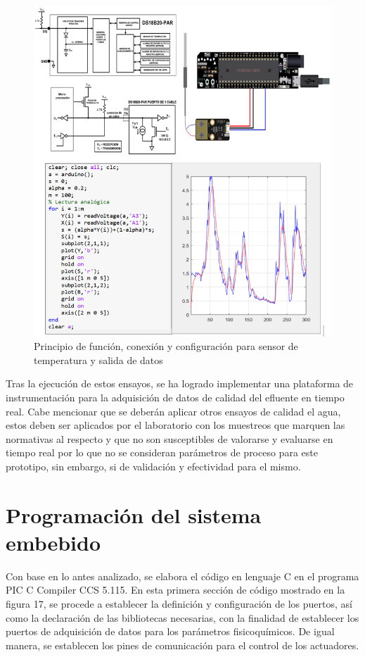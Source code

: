 \documentclass[conference]{IEEEtran}
\begin{document}
\begin{figure}[htbp]
	\centering
	\includegraphics[width=0.9\columnwidth]{fig16.png}
	\caption{Principio de función, conexión y configuración para sensor de temperatura y salida de datos}
	\label{fig:sensor-ph-temperatura}
\end{figure}

Tras la ejecución de estos ensayos, se ha logrado implementar una plataforma de instrumentación para la adquisición de datos de calidad del efluente en tiempo real. Cabe mencionar que se deberán aplicar otros ensayos de calidad el agua, estos deben ser aplicados por el laboratorio con los muestreos que marquen las normativas al respecto y que no son susceptibles de valorarse y evaluarse en tiempo real por lo que no se consideran parámetros de proceso para este prototipo, sin embargo, si de validación y efectividad para el mismo.

\section{Programación del sistema embebido}

Con base en lo antes analizado, se elabora el código en lenguaje C en el programa PIC C Compiler CCS 5.115. En esta primera sección de código mostrado en la figura 17, se procede a establecer la definición y configuración de los puertos, así como la declaración de las bibliotecas necesarias, con la finalidad de establecer los puertos de adquisición de datos para los parámetros fisicoquímicos. De igual manera, se establecen los pines de comunicación para el control de los actuadores.
\end{document}
